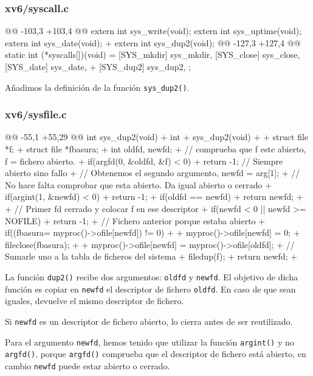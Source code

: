 \subsubsection{xv6/syscall.c}
\begin{listing}
@@ -103,3 +103,4 @@
    extern int sys_write(void);
    extern int sys_uptime(void);
    extern int sys_date(void);
+   extern int sys_dup2(void);
@@ -127,3 +127,4 @@ static int (*syscalls[])(void) = {
    [SYS_mkdir]   sys_mkdir,
    [SYS_close]   sys_close,
    [SYS_date]    sys_date,
+   [SYS_dup2]    sys_dup2,
    };
\end{listing}
\par Añadimos la definición de la función \texttt{sys\_dup2()}.

\subsubsection{xv6/sysfile.c}
\begin{listing}
@@ -55,1 +55,29 @@ int sys_dup2(void)
+   int
+   sys_dup2(void)
+   {
+       struct file *f;
+       struct file *fbasura;
+       int oldfd, newfd;
+       // comprueba que f este abierto, f = fichero abierto.
+       if(argfd(0, &oldfd, &f) < 0)
+           return -1; // Siempre abierto sino fallo
+       // Obtenemos el segundo argumento, newfd = arg[1];
+       // No hace falta comprobar que esta abierto. Da igual abierto o cerrado
+       if(argint(1, &newfd) < 0)
+           return -1;
+       if(oldfd == newfd)
+           return newfd;
+
+       // Primer fd cerrado y colocar f en ese descriptor
+       if(newfd < 0 || newfd >= NOFILE)
+           return -1;
+       // Fichero anterior porque estaba abierto
+       if((fbasura= myproc()->ofile[newfd]) != 0)
+       {
+           myproc()->ofile[newfd] = 0;
+           fileclose(fbasura);
+       }
+       myproc()->ofile[newfd] = myproc()->ofile[oldfd];
+       // Sumarle uno a la tabla de ficheros del sistema
+       filedup(f);
+       return newfd;
+   }
\end{listing}

\par La función \texttt{dup2()} recibe dos argumentos: \texttt{oldfd} y \texttt{newfd}. El objetivo
de dicha función es copiar en \texttt{newfd} el descriptor de fichero \texttt{oldfd}. En caso
de que sean iguales, devuelve el mismo descriptor de fichero.
\par Si \texttt{newfd} es un descriptor de fichero abierto, lo cierra antes de ser
reutilizado. 
\par Para el argumento \texttt{newfd}, hemos tenido que utilizar la función \texttt{argint()}
y no \texttt{argfd()}, porque \texttt{argfd()} comprueba que el descriptor de fichero está abierto, 
en cambio \texttt{newfd} puede estar abierto o cerrado.

